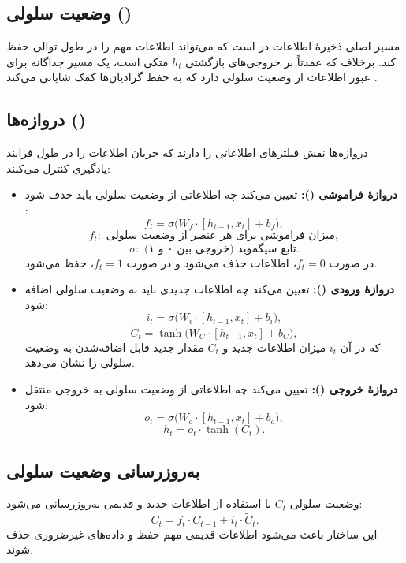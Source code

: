 \subsection{وضعیت سلولی ()}
مسیر اصلی ذخیرهٔ اطلاعات در  است که می‌تواند اطلاعات مهم را در طول توالی حفظ کند. برخلاف  که عمدتاً بر خروجی‌های بازگشتی \( h_t \) متکی است،  یک مسیر جداگانه برای عبور اطلاعات از وضعیت سلولی دارد که به حفظ گرادیان‌ها کمک شایانی می‌کند
\cite{hochreiter1997long}.

\subsection{دروازه‌ها ()}
دروازه‌ها نقش فیلترهای اطلاعاتی را دارند که جریان اطلاعات را در طول فرایند یادگیری کنترل می‌کنند:

\begin{itemize}
	\item \textbf{دروازهٔ فراموشی ():}
	تعیین می‌کند چه اطلاعاتی از وضعیت سلولی باید حذف شود
	\cite{gers1999learning}:
	\[
	f_t = \sigma \big( W_f \cdot [h_{t-1}, x_t] + b_f \big),
	\]
	\[
	f_t:\text{ میزان فراموشی برای هر عنصر از وضعیت سلولی},
	\]
	\[
	\sigma:\text{ تابع سیگموید (خروجی بین ۰ و ۱)}.
	\]
	در صورت \( f_t = 0 \)، اطلاعات حذف می‌شود و در صورت \( f_t = 1 \)، حفظ می‌شود.
	
	\item \textbf{دروازهٔ ورودی ():}
	تعیین می‌کند چه اطلاعات جدیدی باید به وضعیت سلولی اضافه شود:
	\[
	i_t = \sigma \big( W_i \cdot [h_{t-1}, x_t] + b_i \big),
	\]
	\[
	\tilde{C}_t = \tanh \big( W_C \cdot [h_{t-1}, x_t] + b_C \big),
	\]
	که در آن \( i_t \) میزان اطلاعات جدید و \( \tilde{C}_t \) مقدار جدید قابل اضافه‌شدن به وضعیت سلولی را نشان می‌دهد.
	
	\item \textbf{دروازهٔ خروجی ():}
	تعیین می‌کند چه اطلاعاتی از وضعیت سلولی به خروجی منتقل شود:
	\[
	o_t = \sigma \big( W_o \cdot [h_{t-1}, x_t] + b_o \big),
	\]
	\[
	h_t = o_t \cdot \tanh(C_t).
	\]
\end{itemize}

\subsection{به‌روزرسانی وضعیت سلولی}
وضعیت سلولی \( C_t \) با استفاده از اطلاعات جدید و قدیمی به‌روزرسانی می‌شود:
\[
C_t = f_t \cdot C_{t-1} + i_t \cdot \tilde{C}_t.
\]
این ساختار باعث می‌شود اطلاعات قدیمی مهم حفظ و داده‌های غیرضروری حذف شوند.

